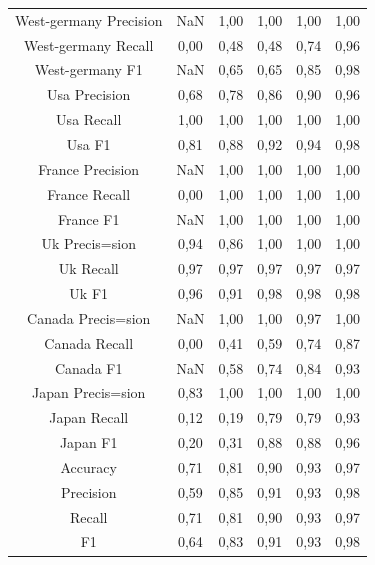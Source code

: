 \documentclass{classrep}
\begin{document}
\begin{table}[h!]
\begin{tabular}{c c c c c c}
\hline
West-germany Precision 	& NaN & 1,00 & 1,00 & 1,00 & 1,00\\
West-germany Recall 		& 0,00 & 0,48 & 0,48 & 0,74 & 0,96\\
West-germany F1		& NaN & 0,65 & 0,65 & 0,85 & 0,98\\
\hline
Usa Precision 			& 0,68 & 0,78 & 0,86 & 0,90 & 0,96\\
Usa Recall				& 1,00 & 1,00 & 1,00 & 1,00 & 1,00\\
Usa F1			 	& 0,81 & 0,88 & 0,92 & 0,94 & 0,98\\
\hline
France Precision 		& NaN & 1,00 & 1,00 & 1,00 & 1,00\\
France Recall 			& 0,00 & 1,00 & 1,00 & 1,00 & 1,00\\
France F1 				& NaN & 1,00 & 1,00 & 1,00 & 1,00\\
\hline
Uk Precis=sion 			& 0,94 & 0,86 & 1,00 & 1,00 & 1,00\\
Uk Recall 				& 0,97 & 0,97 & 0,97 & 0,97 & 0,97\\
Uk F1 				& 0,96 & 0,91 & 0,98 & 0,98 & 0,98\\
\hline
Canada Precis=sion		& NaN & 1,00 & 1,00 & 0,97 & 1,00\\
Canada Recall 			& 0,00 & 0,41 & 0,59 & 0,74 & 0,87\\
Canada F1 			& NaN & 0,58 & 0,74 & 0,84 & 0,93\\
\hline
Japan Precis=sion 		& 0,83 & 1,00 & 1,00 & 1,00 & 1,00\\
Japan Recall 			& 0,12 & 0,19 & 0,79 & 0,79 & 0,93\\
Japan F1 				& 0,20 & 0,31 & 0,88 & 0,88 & 0,96\\
\hline
Accuracy 				& 0,71 & 0,81 & 0,90 & 0,93 & 0,97\\
Precision 				& 0,59 & 0,85 & 0,91 & 0,93 & 0,98\\
Recall 				& 0,71 & 0,81 & 0,90 & 0,93 & 0,97\\
F1 					& 0,64 & 0,83 & 0,91 & 0,93 & 0,98\\

\end {tabular}
\label {Wyniki klasyfikacji dla różnych wartości proporcji podziału zbioru.}
\end{table}
\end{document}
